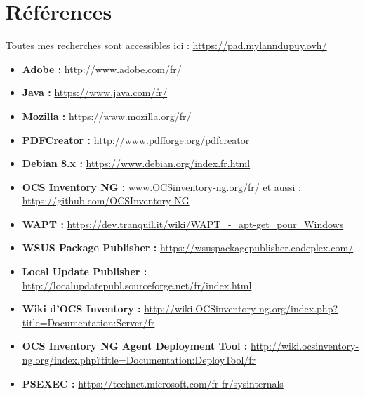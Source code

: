 \documentclass[11pt,a4paper,oneside]{article}
\begin{document}
\section{Références}
Toutes mes recherches sont accessibles ici : \url {https://pad.mylanndupuy.ovh/}
\begin{itemize}
\item \textbf{Adobe :} \url {http://www.adobe.com/fr/} 
\item \textbf{Java :} \url {https://www.java.com/fr/}
\item \textbf{Mozilla :} \url {https://www.mozilla.org/fr/}
\item \textbf{PDFCreator :} \url {http://www.pdfforge.org/pdfcreator}
\item \textbf{Debian 8.x :} \url {https://www.debian.org/index.fr.html} 
\item \textbf{OCS Inventory NG :} \url {www.OCSinventory-ng.org/fr/} et aussi : \url {https://github.com/OCSInventory-NG}
\item \textbf{WAPT :} \url {https://dev.tranquil.it/wiki/WAPT_-_apt-get_pour_Windows}
\item \textbf{WSUS Package Publisher :} \url {https://wsuspackagepublisher.codeplex.com/}
\item \textbf{Local Update Publisher :} \url {http://localupdatepubl.sourceforge.net/fr/index.html}
\item \textbf{Wiki d'OCS Inventory :} \url{http://wiki.OCSinventory-ng.org/index.php?title=Documentation:Server/fr}
\item \textbf{OCS Inventory NG Agent Deployment Tool :} \url {http://wiki.ocsinventory-ng.org/index.php?title=Documentation:DeployTool/fr}
\item \textbf{PSEXEC :} \url {https://technet.microsoft.com/fr-fr/sysinternals}
\end{itemize}
\end{document}
